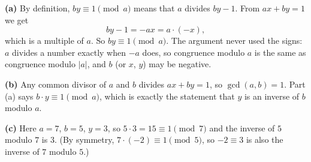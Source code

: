 \textbf{(a)} By definition, $by\equiv1\pmod a$ means that $a$ divides $by-1$. From $ax+by=1$ we get
\[by-1=-ax=a\cdot(-x),\]
which is a multiple of $a$. So $by\equiv1\pmod a$. The argument never used the signs: $a$ divides a number exactly when $-a$ does, so congruence modulo $a$ is the same as congruence modulo $|a|$, and $b$ (or $x$, $y$) may be negative.

\textbf{(b)} Any common divisor of $a$ and $b$ divides $ax+by=1$, so $\gcd(a,b)=1$. Part (a) says $b\cdot y\equiv1\pmod a$, which is exactly the statement that $y$ is an inverse of $b$ modulo $a$.

\textbf{(c)} Here $a=7$, $b=5$, $y=3$, so $5\cdot3=15\equiv1\pmod7$ and the inverse of $5$ modulo $7$ is $\boxed{3}$. (By symmetry, $7\cdot(-2)\equiv1\pmod5$, so $-2\equiv3$ is also the inverse of $7$ modulo $5$.)
